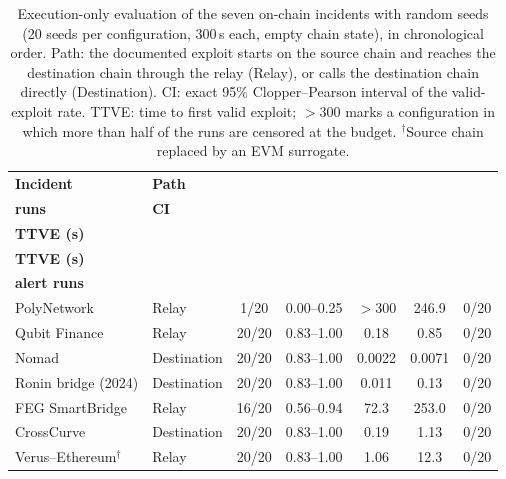 \documentclass[a4paper]{cas-sc}
\newcommand{\hd}[1]{{\bfseries\boldmath #1}}
\begin{document}
\begin{table}[pos=t,belowcap=4pt]
\centering
\caption{Execution-only evaluation of the seven on-chain incidents with random seeds (20 seeds per configuration, 300\,s each, empty chain state), in chronological order. Path: the documented exploit starts on the source chain and reaches the destination chain through the relay (Relay), or calls the destination chain directly (Destination). CI: exact 95\% Clopper--Pearson interval of the valid-exploit rate. TTVE: time to first valid exploit; $>$300 marks a configuration in which more than half of the runs are censored at the budget. $^{\dagger}$Source chain replaced by an EVM surrogate.}
\label{tab:seven}
\footnotesize
\begin{tabular*}{\linewidth}{@{\extracolsep{\fill}}llccccc@{}}
\toprule
\hd{Incident} & \hd{Path} & \begin{tabular}[b]{@{}c@{}}\hd{Valid-exploit}\\ \hd{runs}\end{tabular} & \hd{CI} & \begin{tabular}[b]{@{}c@{}}\hd{Median}\\ \hd{TTVE (s)}\end{tabular} & \begin{tabular}[b]{@{}c@{}}\hd{Max}\\ \hd{TTVE (s)}\end{tabular} & \begin{tabular}[b]{@{}c@{}}\hd{Patched}\\ \hd{alert runs}\end{tabular} \\
\midrule
PolyNetwork                 & Relay       & 1/20  & 0.00--0.25 & $>$300 & 246.9  & 0/20 \\
Qubit Finance               & Relay       & 20/20 & 0.83--1.00 & 0.18   & 0.85   & 0/20 \\
Nomad                       & Destination & 20/20 & 0.83--1.00 & 0.0022 & 0.0071 & 0/20 \\
Ronin bridge (2024)         & Destination & 20/20 & 0.83--1.00 & 0.011  & 0.13   & 0/20 \\
FEG SmartBridge             & Relay       & 16/20 & 0.56--0.94 & 72.3   & 253.0  & 0/20 \\
CrossCurve                  & Destination & 20/20 & 0.83--1.00 & 0.19   & 1.13   & 0/20 \\
Verus--Ethereum$^{\dagger}$ & Relay       & 20/20 & 0.83--1.00 & 1.06   & 12.3   & 0/20 \\
\bottomrule
\end{tabular*}
\end{table}
\end{document}
